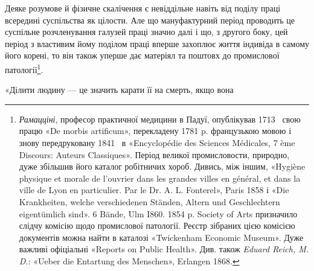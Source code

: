 Деяке розумове й фізичне скалічення є невіддільне навіть від
поділу праці всередині суспільства як цілости. Але що мануфактурний
період проводить це суспільне розчленування галузей
праці значно далі і що, з другого боку, цей період з властивим
йому поділом праці вперше захоплює життя індивіда в самому
його корені, то він також уперше дає матеріял та поштовх до
промислової патології\footnote{
\emph{Рамацціні}, професор практичної медицини в Падуї, опублікував
1713~ свою працю «De morbis artificum», перекладену 1781 p.
французькою мовою і знову передруковану 1841~ в «Encyclopédie des
Sciences Médicales, 7 ème Discours: Auteurs Classiques». Період великої
промисловости, природно, дуже збільшив його каталог робітничих хороб.
Дивись, між іншим, «Hygiène physique et morale de l’ouvrier dans les
grandes villes en général, et dans la ville de Lyon en particulier. Par le
Dr. A. L. Fonterel», Paris 1858 і «Die Krankheiten, welche verschiedenen
Ständen, Altern und Geschlechtern eigentümlich sind». 6 Bände, Ulm I860.
1854 p. Society of Arts призначило слідчу комісію щодо промислової
патології. Реєстр зібраних цією комісією документів можна найти в каталозі
«Twickenham Economic Museum». Дуже важливі офіціальні «Reports
on Public Health». Див. також \emph{Eduard Reich, M. D.}: «Ueber
die Entartung des Menschen», Erlangen 1868.
}.

«Ділити людину — це значить карати її на смерть, якщо вона
\parbreak{}  %
